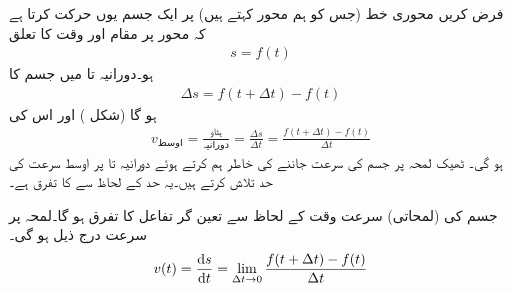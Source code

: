 فرض کریں   محوری خط (جس کو ہم  محور کہتے ہیں)  پر ایک جسم یوں حرکت کرتا ہے کہ  محور پر مقام  اور وقت  کا تعلق 
\begin{align*}
s=f(t)
\end{align*}
ہو۔دورانیہ  تا  میں جسم کا 
\begin{align*}
\Delta s=f(t+\Delta t)-f(t)
\end{align*}
ہو گا (شکل ) اور اس کی 
\begin{align*}
v_{\text{اوسط}}=\frac{\text{ہٹاو}}{\text{دورانیہ}}=\frac{\Delta s}{\Delta t}=\frac{f(t+\Delta t)-f(t)}{\Delta t}
\end{align*}
ہو گی۔ ٹھیک لمحہ  پر جسم کی سرعت جاننے کی خاطر ہم  کرتے ہوئے دورانیہ  تا  پر اوسط سرعت کی حد تلاش کرتے ہیں۔یہ حد  کے لحاظ سے  کا تفرق ہے۔

جسم کی (لمحاتی) سرعت وقت کے لحاظ سے تعین گر تفاعل  کا تفرق ہو گا۔لمحہ  پر سرعت درج ذیل ہو گی۔
\begin{align*}
v(t)=\frac{\dif s}{\dif t}=\lim_{\Delta t\to 0}\frac{f(t+\Delta t)-f(t)}{\Delta t}
\end{align*} 

